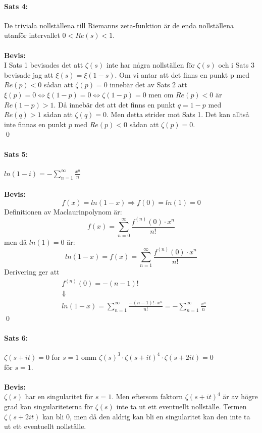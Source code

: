 \documentclass{article}%
\begin{document}
\paragraph{Sats 4:} De triviala nollställena till Riemanns zeta-funktion är de enda nollställena utanför intervallet $0 < Re(s) < 1$.\\
\\
{\bf Bevis:}\\ %
I Sats 1 bevisades det att $\zeta(s)$ inte har några nollställen för $\zeta(s)$ och i Sats 3 bevisade jag att $\xi(s) = \xi(1 - s)$.
Om vi antar att det finns en punkt p med $Re(p) < 0$ sådan att $\zeta(p) = 0$ innebär det av Sats 2 att $\xi(p) = 0 \Leftrightarrow
\xi(1 - p) = 0 \Leftrightarrow \zeta(1 - p) = 0$ men om $Re(p) < 0$ är $Re(1 - p) > 1$. Då innebär det att det finns en punkt
$q = 1 - p$ med $Re(q) > 1$ sådan att $\zeta(q) = 0$. Men detta strider mot Sats 1. Det kan alltså inte finnas en punkt $p$ med
$Re(p) < 0$ sådan att $\zeta(p) = 0$. \\
\hfill \qed %

\pagebreak

\paragraph{Sats 5:} $ln(1 - i) = - \sum\limits_{n = 1}^\infty \frac {x^n} n$ \\
\\
{\bf Bevis:}\\
$$f(x) = ln(1 - x) \Rightarrow f(0) = ln(1) = 0$$
Definitionen av Maclaurinpolynom är:
$$f(x) = \sum_{n = 0}^\infty \frac {f^{(n)}(0) \cdot x^n} {n!}$$
men då $ln(1) = 0$ är:
$$ln(1 - x) = f(x) = \sum_{n = 1}^{\infty} \frac {f^{(n)}(0) \cdot x^n} {n!}$$
Derivering ger att
\begin{align*}
	&f^{(n)}(0) = -(n - 1)! \\
	&\Downarrow \\ 
	&ln(1 - x) = \sum_{n = 1}^\infty \frac {-(n - 1)! \cdot x^n} {n!} = - \sum_{n = 1}^\infty \frac {x^n} n
\end{align*}
\hfill \qed

\paragraph{Sats 6:} $\zeta(s + it) = 0$ for $s = 1$ omm $\zeta(s)^3 \cdot \zeta(s + it)^4 \cdot \zeta(s + 2it) = 0$ \\
för $s = 1$. \\
\\
{\bf Bevis:}\\
$\zeta(s)$ har en singularitet för $s = 1$. Men eftersom faktorn $\zeta(s + it)^4$ är av högre grad kan singulariteterna
för $\zeta(s)$ inte ta ut ett eventuellt nollställe. Termen $\zeta(s + 2it)$ kan bli $0$, men då den aldrig kan bli en 
singularitet kan den inte ta ut ett eventuellt nollställe.\\
\end{document}
